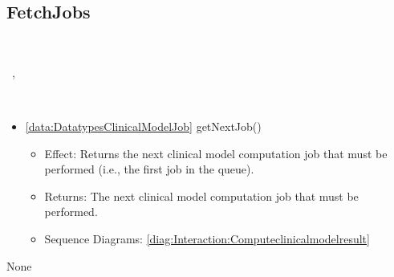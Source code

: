   \subsection{FetchJobs}\label{int:InterfacesFetchJobs}
    \begin{description}
      \item[Provided by:] \iconcomponent{}~
      \item[Required by:] \iconcomponent{}~, \iconcomponent{}~ 
      \item[Operations:] ~
    \begin{itemize}[noitemsep,nolistsep,leftmargin=-.25cm]
      \item \textsf{\ref{data:DatatypesClinicalModelJob} getNextJob()}
        \begin{itemize}[noitemsep,nolistsep]
           \item Effect: Returns the next clinical model computation job that must be performed (i.e., the first job in the queue). 
           \item Returns: The next clinical model computation job that must be performed.
           \item Sequence Diagrams: \cref{diag:Interaction:Computeclinicalmodelresult}
        \end{itemize}
    \end{itemize}
      \item[Diagrams:] None
    \end{description}

